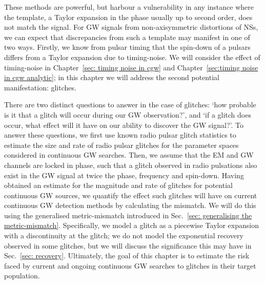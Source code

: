 \documentclass[../full_thesis/full_thesis.tex]{subfiles}
\begin{document}
These methods are powerful, but harbour a vulnerability in any instance where
the template, a Taylor expansion in the phase usually up to second order, does
not match the signal. For GW signals from non-axisymmetric distortions of NSs,
we can expect that discrepancies from such a template may manifest in one of
two ways. Firstly, we know from pulsar timing that the spin-down of a pulsars
differs from a Taylor expansion due to timing-noise. We will
consider the effect of timing-noise in Chapter~\ref{sec: timing noise in cgw}
and Chapter~\ref{sec:timing noise in cgw analytic};
in this chapter we will
address the second potential manifestation: glitches.

There are two distinct questions to answer in the case of glitches: `how
probable is it that a glitch will occur during our GW observation?', and `if a
glitch does occur, what effect will it have on our ability to discover the GW
signal?'. To answer these questions, we first use known radio pulsar glitch
statistics to estimate the size and rate of radio pulsar glitches for the
parameter spaces considered in continuous GW searches. Then, we assume that the
EM and GW channels are locked in phase, such that a glitch observed in radio
pulsations also exist in the GW signal at twice the phase, frequency and
spin-down. Having obtained an estimate for the magnitude and rate of glitches
for potential continuous GW sources, we quantify the effect such glitches will
have on current continuous GW detection methods by calculating the mismatch. We
will do this using the generalised metric-mismatch introduced in Sec.~\ref{sec:
generalising the metric-mismatch}. Specifically, we model a glitch as a
piecewise Taylor expansion with a discontinuity at the glitch; we do not model
the exponential recovery observed in some glitches, but we will discuss the
significance this may have in Sec.~\ref{sec: recovery}. Ultimately, the goal of
this chapter is to estimate the risk faced by current and ongoing continuous GW
searches to glitches in their target population.
\end{document}
